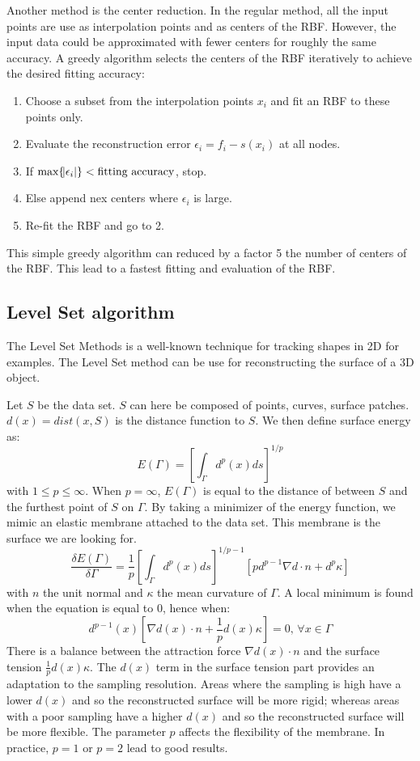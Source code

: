 \documentclass[12pt]{article}
\begin{document}
Another method is the center reduction. In the regular method, all the input points are use as interpolation points and as centers of the RBF. However, the input data could be approximated with fewer centers for roughly the same accuracy. A greedy algorithm selects the centers of the RBF iteratively to achieve the desired fitting accuracy:
\begin{enumerate}
\item Choose a subset from the interpolation points $x_i$ and fit an RBF to these points only.
\item Evaluate the reconstruction error $\epsilon_i = f_i - s(x_i)$ at all nodes.
\item If $\text{max}\{\abs{\epsilon_i}\} < \text{fitting accuracy}$, stop.
\item Else append nex centers where $\epsilon_i$ is large.
\item Re-fit the RBF and go to 2.
\end{enumerate}
This simple greedy algorithm can reduced by a factor 5 the number of centers of the RBF. This lead to a fastest fitting and evaluation of the RBF.

\subsection{Level Set algorithm}
The Level Set Methods is a well-known technique for tracking shapes in 2D for examples. The Level Set method can be use for reconstructing the surface of a 3D object.

Let $S$ be the data set. $S$ can here be composed of points, curves, surface patches. $d(x) = dist(x,S)$ is the distance function to $S$. We then define surface energy as:
$$E(\Gamma) = \left[\int_{\Gamma} d^p(x)ds\right]^{1/p}$$
with $1 \le p \le \infty$. When $p = \infty$, $E(\Gamma)$ is equal to the distance of between $S$ and the furthest point of $S$ on $\Gamma$. By taking a minimizer of the energy function, we mimic an elastic membrane attached to the data set. This membrane is the surface we are looking for.
$$\frac{\delta E(\Gamma)}{\delta\Gamma} = \frac{1}{p}\left[\int_{\Gamma} d^p(x)ds\right]^{1/p - 1}[pd^{p-1}\nabla d \cdot n +d^p\kappa]$$
with $n$ the unit normal and $\kappa$ the mean curvature of $\Gamma$. A local minimum is found when the equation is equal to 0, hence when:
$$d^{p-1}(x)[\nabla d(x) \cdot n + \frac{1}{p}d(x)\kappa] = 0\text{, }\forall x\in\Gamma$$
There is a balance between the attraction force $\nabla d(x) \cdot n$ and the surface tension $\frac{1}{p}d(x)\kappa$. The $d(x)$ term in the surface tension part provides an adaptation to the sampling resolution. Areas where the sampling is high have a lower $d(x)$ and so the reconstructed surface will be more rigid; whereas areas with a poor sampling have a higher $d(x)$ and so the reconstructed surface will be more flexible. The parameter $p$ affects the flexibility of the membrane. In practice, $p = 1$ or $p = 2$ lead to good results.
\end{document}
